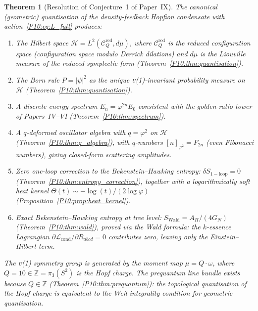 \documentclass[11pt,a4paper]{article}
\newtheorem{theorem}{Theorem}[section]
\theoremstyle{definition}
\theoremstyle{remark}
\newcommand{\vp}{\varphi}
\newcommand{\ZZ}{\mathbb{Z}}
\newcommand{\Hil}{\mathcal{H}}
\newcommand{\CQr}{\mathcal{C}_Q^{\mathrm{red}}}
\newcommand{\dmu}{d\mu}
\begin{document}
\begin{theorem}[Resolution of Conjecture~1 of Paper~IX]
\label{P10:thm:main}
The canonical (geometric) quantisation of the density-feedback
Hopfion condensate with action~\eqref{P10:eq:L_full} produces:
\begin{enumerate}[label=\emph{(\roman*)}]
  \item The Hilbert space $\Hil = L^2(\CQr,\dmu)$,
    where $\CQr$ is the reduced configuration space
    (configuration space modulo Derrick dilations)
    and $\dmu$ is the Liouville measure of the reduced
    symplectic form (Theorem~\ref{P10:thm:quantisation}).

  \item The Born rule $P=|\psi|^2$ as the unique
    \textsc{u}(1)-invariant probability measure
    on $\Hil$ (Theorem~\ref{P10:thm:quantisation}).

  \item A discrete energy spectrum $E_n = \vp^{2n}E_0$
    consistent with the golden-ratio tower of Papers~IV--VI
    (Theorem~\ref{P10:thm:spectrum}).

  \item A $q$-deformed oscillator algebra with $q=\vp^2$
    on $\Hil$ (Theorem~\ref{P10:thm:q_algebra}), with
    $q$-numbers $[n]_{\vp^2}=F_{2n}$ (even Fibonacci numbers),
    giving closed-form scattering amplitudes.

  \item Zero one-loop correction to the Bekenstein--Hawking entropy:
    $\delta S_\mathrm{1-loop}=0$
    (Theorem~\ref{P10:thm:entropy_correction}), together with a
    logarithmically soft heat kernel
    $\Theta(t)\sim-\log(t)/(2\log\vp)$
    (Proposition~\ref{P10:prop:heat_kernel}).

  \item Exact Bekenstein--Hawking entropy at tree level:
    $S_\mathrm{Wald}=A_H/(4G_N)$ (Theorem~\ref{P10:thm:wald}),
    proved via the Wald formula: the $k$-essence Lagrangian
    $\partial\mathcal{L}_\mathrm{cond}/\partial R_{abcd}=0$
    contributes zero, leaving only the Einstein--Hilbert term.
\end{enumerate}
The \textsc{u}(1) symmetry group is generated by the moment map
$\mu = Q\cdot\omega$, where $Q=10\in\ZZ=\pi_3(S^2)$ is the
Hopf charge.
The prequantum line bundle exists because $Q\in\ZZ$
(Theorem~\ref{P10:thm:prequantum}): the topological quantisation
of the Hopf charge is equivalent to the Weil integrality
condition for geometric quantisation.
\end{theorem}
\end{document}

